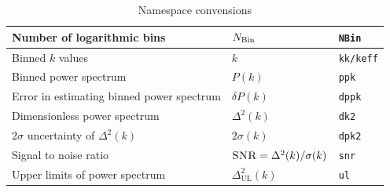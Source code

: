 \documentclass[a4paper,11pt,oneside,english,openany]{sphinxmanual}
\begin{document}
\begin{table}[htbp]
{\begin{tabular}{||p{}|l|l||}
      Number of logarithmic bins & $N_{\rm Bin}$         & \texttt{NBin}\\ \hline
      Binned $k$ values      & $k$                       & \texttt{kk/keff}\\ \hline
      Binned power spectrum  & $P(k)$                    & \texttt{ppk}\\ \hline
      Error in estimating binned power spectrum          & $\delta P(k)$                       & \texttt{dppk}\\ \hline
      Dimensionless power spectrum & $\Delta^2(k)$ & \texttt{dk2}\\ \hline
      $2\sigma$ uncertainty of $\Delta^2(k)$ & $2\sigma(k)$ & \texttt{dpk2}\\ \hline
      Signal to noise ratio & $\textsc{SNR} = \Delta^2(k)/\sigma(k)$ & \texttt{snr} \\ \hline
      Upper limits of power spectrum & $\Delta^2_{\text{UL}}(k)$ & \texttt{ul}\\
      \hline\hline
    \end{tabular}
  }
  \caption{Namespace convensions}
  \label{tab:f_outputs}
\end{table}
\clearpage
{}
\end{document}
